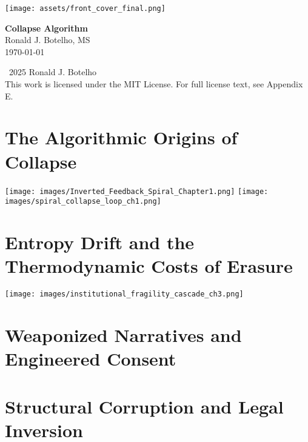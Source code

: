 \documentclass[12pt]{book}
\begin{document}
\begin{titlepage}
    \centering
    \vspace*{2cm}
    \texttt{[image: assets/front\_cover\_final.png]} \\
    \vspace*{1.5cm}
\end{titlepage}

\begin{titlepage}
    \centering
    {\Huge\bfseries Collapse Algorithm} \\[1cm]
    {\Large Ronald J. Botelho, MS} \\[0.5cm]
    \vfill
    {\large \today}
\end{titlepage}

\newpage
\thispagestyle{empty}
\mbox{}

\newpage
\thispagestyle{empty}
\begin{center}
    \textcopyright~2025 Ronald J. Botelho \\[1ex]
    This work is licensed under the MIT License. For full license text, see Appendix E.
\end{center}

\newpage
\tableofcontents
\newpage

\chapter{The Algorithmic Origins of Collapse}
\label{chap:introduction}
\texttt{[image: images/Inverted\_Feedback\_Spiral\_Chapter1.png]}
\texttt{[image: images/spiral\_collapse\_loop\_ch1.png]}


\chapter{Entropy Drift and the Thermodynamic Costs of Erasure}
\texttt{[image: images/institutional\_fragility\_cascade\_ch3.png]}



\chapter{Weaponized Narratives and Engineered Consent}


\chapter{Structural Corruption and Legal Inversion}

\end{document}
